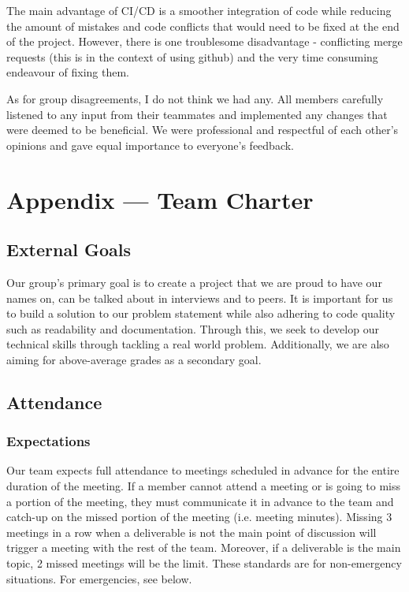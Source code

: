 \documentclass{article}
\begin{document}
The main advantage of CI/CD is a smoother integration of code while reducing the amount of mistakes and code conflicts that would need to be fixed at the end of the project. However, there is one troublesome disadvantage - conflicting merge requests (this is in the context of using github) and the very time consuming endeavour of fixing them. 

As for group disagreements, I do not think we had any. All members carefully listened to any input from their teammates and implemented any changes that were deemed to be beneficial. We were professional and respectful of each other’s opinions and gave equal importance to everyone’s feedback. \\


\newpage{}

\section*{Appendix --- Team Charter}


\subsection*{External Goals}

Our group's primary goal is to create a project that we are proud to have our names
on, can be talked about in interviews and to peers. It is important for us to build 
a solution to our problem statement while also adhering to code quality such as 
readability and documentation. Through this, we seek to develop our technical skills 
through tackling a real world problem. Additionally, we are also aiming for above-average 
grades as a secondary goal. 

\subsection*{Attendance}

\subsubsection*{Expectations}

Our team expects full attendance to meetings scheduled in advance for the entire duration 
of the meeting. If a member cannot attend a meeting or is going to miss a portion of the meeting, 
they must communicate it in advance to the team and catch-up on the missed portion of the meeting 
(i.e. meeting minutes). Missing 3 meetings in a row when a deliverable is not the main point of 
discussion will trigger a meeting with the rest of the team. Moreover, if a deliverable is the 
main topic, 2 missed meetings will be the limit. These standards are for non-emergency situations. 
For emergencies, see below. 
\end{document}
